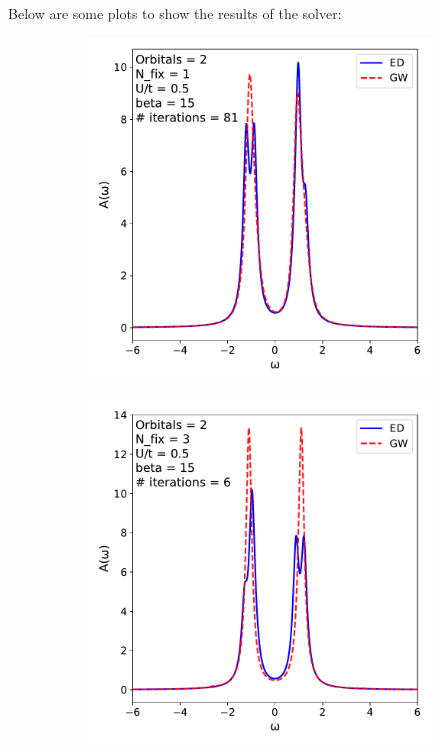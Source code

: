 \documentclass[12pt]{article}
\begin{document}
Below are some plots to show the results of the solver:
\begin{figure}[h!]
  \centering
  \begin{subfigure}[b]{0.45\textwidth}
    \includegraphics[width=\textwidth]{specgw21.pdf}
  \end{subfigure}
  \hspace{0.02\textwidth}
  \begin{subfigure}[b]{0.45\textwidth}
    \includegraphics[width=\textwidth]{specgw23.pdf}

\end{subfigure}
\end{figure}
\end{document}
